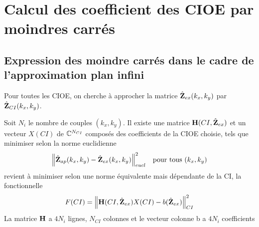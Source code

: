 \section{Calcul des coefficient des CIOE par moindres carrés}


\subsection{Expression des moindre carrés dans le cadre de l'approximation plan infini}
  Pour toutes les CIOE, on cherche à approcher la matrice \(\hat{\mathbf{Z}}_{ex}(k_x,k_y)\) par \(\hat{\mathbf{Z}}_{CI}(k_x,k_y)\). 

  \begin{prop}
    Soit \(N_i\) le nombre de couples \((k_x,k_y)\).
    Il existe une matrice \(\mathbf{H}(CI,\hat{\mathbf{Z}}_{ex})\) et un vecteur \(X(CI)\) de \(\mathbb C^{N_{CI}}\) composés des coefficients de la CIOE choisie, tels que minimiser selon la norme euclidienne
    \begin{align*}
      \left\lVert \hat{\mathbf{Z}}_{ap}(k_x,k_y)-\hat{\mathbf{Z}}_{ex}(k_x,k_y)\right\rVert^2_{eucl} & & \text{pour tous \((k_x,k_y)\)}
    \end{align*}
    revient à minimiser selon une norme équivalente mais dépendante de la CI, la fonctionnelle
    \[ 
      F(CI) = \left\lVert  \mathbf{H}(CI,\hat{\mathbf{Z}}_{ex}) X(CI) - b(\hat{\mathbf{Z}}_{ex}) \right\rVert^2_{CI}
    \]
    La matrice \(\mathbf{H}\) a \(4N_{i}\) lignes, \(N_{CI}\) colonnes et le vecteur colonne b a \(4N_{i}\) coefficients
  \end{prop}

